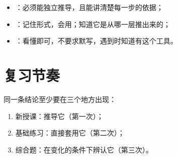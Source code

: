 \begin{itemize}
  \item {}：必须能独立推导，且能讲清楚每一步的依据；
  \item {}：记住形式，会用；知道它是从哪一层推出来的；
  \item {}：看懂即可，不要求默写，遇到时知道有这个工具。
\end{itemize}

\section{复习节奏}

同一条结论至少要在三个地方出现：

\begin{enumerate}
  \item 新授课：推导它（第一次）；
  \item 基础练习：直接套用它（第二次）；
  \item 综合题：在变化的条件下辨认它（第三次）。
\end{enumerate}
